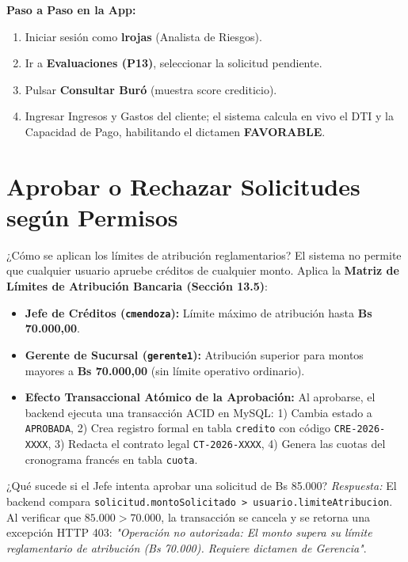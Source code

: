 \documentclass[11pt,letterpaper]{article}
\begin{document}
\begin{demobox}
\textbf{Paso a Paso en la App:}
\begin{enumerate}
    \item Iniciar sesión como \textbf{lrojas} (Analista de Riesgos).
    \item Ir a \textbf{Evaluaciones (P13)}, seleccionar la solicitud pendiente.
    \item Pulsar \textbf{Consultar Buró} (muestra score crediticio).
    \item Ingresar Ingresos y Gastos del cliente; el sistema calcula en vivo el DTI y la Capacidad de Pago, habilitando el dictamen \textbf{FAVORABLE}.
\end{enumerate}
\end{demobox}

\section{Aprobar o Rechazar Solicitudes según Permisos}

\begin{respuestabox}{¿Cómo se aplican los límites de atribución reglamentarios?}
El sistema no permite que cualquier usuario apruebe créditos de cualquier monto. Aplica la \textbf{Matriz de Límites de Atribución Bancaria (Sección 13.5)}:
\begin{itemize}
    \item \textbf{Jefe de Créditos (\texttt{cmendoza}):} Límite máximo de atribución hasta \textbf{Bs 70.000,00}.
    \item \textbf{Gerente de Sucursal (\texttt{gerente1}):} Atribución superior para montos mayores a \textbf{Bs 70.000,00} (sin límite operativo ordinario).
    \item \textbf{Efecto Transaccional Atómico de la Aprobación:}
    Al aprobarse, el backend ejecuta una transacción ACID en MySQL: 1) Cambia estado a \texttt{APROBADA}, 2) Crea registro formal en tabla \texttt{credito} con código \texttt{CRE-2026-XXXX}, 3) Redacta el contrato legal \texttt{CT-2026-XXXX}, 4) Genera las cuotas del cronograma francés en tabla \texttt{cuota}.
\end{itemize}
\end{respuestabox}

\begin{preguntatrampabox}{¿Qué sucede si el Jefe intenta aprobar una solicitud de Bs 85.000?}
\textit{Respuesta:} El backend compara \texttt{solicitud.montoSolicitado > usuario.limiteAtribucion}. Al verificar que $85.000 > 70.000$, la transacción se cancela y se retorna una excepción HTTP 403: \textit{"Operación no autorizada: El monto supera su límite reglamentario de atribución (Bs 70.000). Requiere dictamen de Gerencia"}.
\end{preguntatrampabox}
\end{document}
